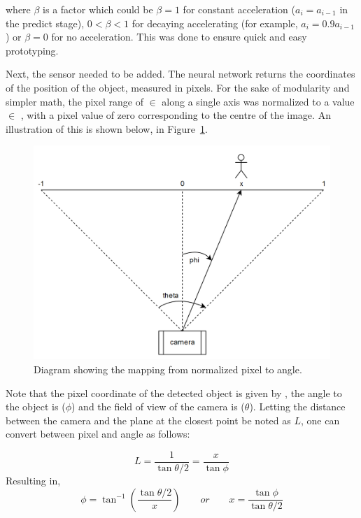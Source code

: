 where $\beta$ is a factor which could be $\beta = 1$ for constant acceleration ($a_i = a_{i-1}$ in the predict stage), $0 < \beta < 1$ for decaying accelerating (for example, $a_i = 0.9 a_{i-1}$) or $\beta = 0$ for no acceleration. This was done to ensure quick and easy prototyping.

Next, the sensor needed to be added. The neural network returns the coordinates of the position of the object, measured in pixels. For the sake of modularity and simpler math, the pixel range of  $\in$ \pyth{[0, 299]} along a single axis was normalized to a value  $\in$ \pyth{[-1, 1]}, with a pixel value of zero corresponding to the centre of the image. An illustration of this is shown below, in Figure~\ref{fig:pixel_to_angle}.

\begin{figure}[h!]
  \centering
  \includegraphics[width=\textwidth]{methodology/pixel_to_angle2}
  \caption{\label{fig:pixel_to_angle} Diagram showing the mapping from normalized pixel to angle.}
\end{figure}

Note that the pixel coordinate of the detected object is given by , the angle to the object is  ($\phi$) and the field of view of the camera is  ($\theta$). Letting the distance between the camera and the plane at the closest point be noted as $L$, one can convert between pixel and angle as follows:

\[ L = \frac{1}{\tan{\theta/2}} = \frac{x}{\tan{\phi}} \]
Resulting in,
\[ \phi = \tan^{-1}{\left( \frac{\tan{ \theta/2 }}{x} \right) }
\qquad or
\qquad x = \frac{\tan{\phi}}{\tan{\theta/2}} \]

